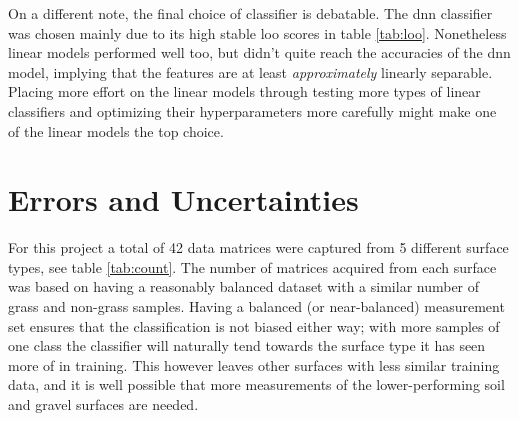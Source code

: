 On a different note, the final choice of classifier is debatable. The \gls{dnn} classifier was chosen mainly due to its high stable \gls{loo} scores in table \ref{tab:loo}. Nonetheless linear models performed well too, but didn't quite reach the accuracies of the \gls{dnn} model, implying that the features are at least \emph{approximately} linearly separable. Placing more effort on the linear models through testing more types of linear classifiers and optimizing their hyperparameters more carefully might make one of the linear models the top choice.


\section{Errors and Uncertainties}
For this project a total of 42 data matrices were captured from 5 different surface types, see table \ref{tab:count}. The number of matrices acquired from each surface was based on having a reasonably balanced dataset with a similar number of grass and non-grass samples. Having a balanced (or near-balanced) measurement set ensures that the classification is not biased either way; with more samples of one class the classifier will naturally tend towards the surface type it has seen more of in training. This however leaves other surfaces with less similar training data, and it is well possible that more measurements of the lower-performing soil and gravel surfaces are needed.  


